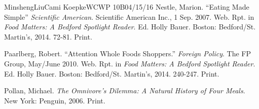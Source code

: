 \documentclass[12pt,letterpaper]{article}
\begin{document}
\begin{mla}{Minsheng}{Liu}{Cami Koepke}{WCWP 10B}{04/15/16}
\bibent Nestle, Marion. ``Eating Made Simple'' \textit{Scientific American}.
Scientific American Inc., 1 Sep. 2007. Web. Rpt. in \textit{Food Matters: A
Bedford Spotlight Reader}. Ed. Holly Bauer. Boston: Bedford/St. Martin's, 2014.
72-81. Print.

\bibent Paarlberg, Robert. ``Attention Whole Foods Shoppers.'' \textit{Foreign
Policy}. The FP Group, May/June 2010. Web. Rpt. in \textit{Food Matters: A
Bedford Spotlight Reader}. Ed. Holly Bauer. Boston: Bedford/St. Martin’s, 2014.
240-247. Print.

\bibent Pollan, Michael. \textit{The Omnivore's Dilemma: A Natural History of
Four Meals}. New York: Penguin, 2006. Print.
\end{mla}
\end{document}

